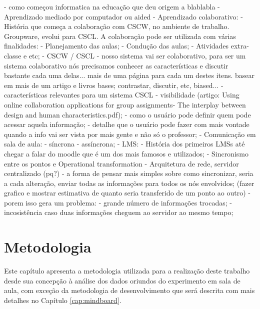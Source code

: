             - como começou informatica na educação que deu origem a blablabla
            - Aprendizado mediado por computador ou aided
            - Aprendizado colaborativo:
                - História que começa a colaboração com CSCW, no ambiente de trabalho. Groupware, evolui para CSCL. A colaboração pode ser utilizada com várias finalidades:
                    - Planejamento das aulas;
                    - Condução das aulas;
                    - Atividades extra-classe e etc;
                - CSCW / CSCL
                    - nosso sistema vai ser colaborativo, para ser um sistema colaborativo nós precisamos conhecer as características e discutir bastante cada uma delas... mais de uma página para cada um destes itens. basear em mais de um artigo e livros bases; contrastar, discutir, etc, biased...
                    - características relevantes para um sistema CSCL
                        - visibilidade (artigo: Using online collaboration applications for group assignments- The interplay between design and human characteristics.pdf);
                    - como o usuário pode definir quem pode acessar aquela informação;
                    - detalhe que o usuário pode fazer com mais vontade quando a info vai ser vista por mais gente e não só o professor;
                        - Comunicação em sala de aula: 
                            - síncrona 
                            - assíncrona;
            - LMS:
                - História dos primeiros LMSs até chegar a falar do moodle que é um dos mais famosos e utilizados;
            - Sincronismo entre os pontos e Operational transformation
                - Arquitetura de rede, servidor centralizado (pq?)
                - a forma de pensar mais simples sobre como sincronizar, seria a cada alteração, enviar todas as informações para todos os nós envolvidos;
                (fazer grafico e mostrar estimativa de quanto seria transferido de um ponto ao outro)
                    - porem isso gera um problema: 
                        - grande número de informações trocadas;
                        - incosistência caso duas informações cheguem ao servidor ao mesmo tempo;


\chapter{Metodologia}
\label{cap:metodologia}

Este capítulo apresenta a metodologia utilizada para a realização deste trabalho desde sua concepção à análise dos dados oriundos do experimento em sala de aula, com exceção da  metodologia de desenvolvimento que será descrita com mais detalhes no Capítulo \ref{cap:mindboard}. 

